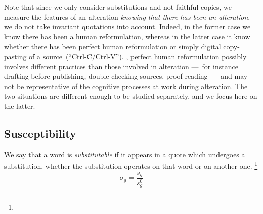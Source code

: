 Note that since we only consider substitutions and not faithful copies, we measure the features of an alteration \emph{knowing that there has been an alteration},  we do not take invariant quotations into account.
Indeed, in the former case we know there has been a human reformulation, whereas in the latter case it  know whether there has been perfect human reformulation or simply digital copy-pasting of a source~(``{\sc Ctrl-C}/{\sc Ctrl-V}'').
, perfect human reformulation possibly involves different practices than those involved in alteration ---~for instance drafting before publishing, double-checking sources, proof-reading~--- and may not be representative of the cognitive processes at work during alteration.
The two situations are different enough to be studied separately, and we focus here on the latter.

\subsection{Susceptibility}

We say that a word is \emph{substitutable} if it appears in a quote which undergoes a substitution, whether the substitution operates on that word or on another one.
\footnote{
}
$$\sigma_g = \frac{s_g}{s_g^0}$$

